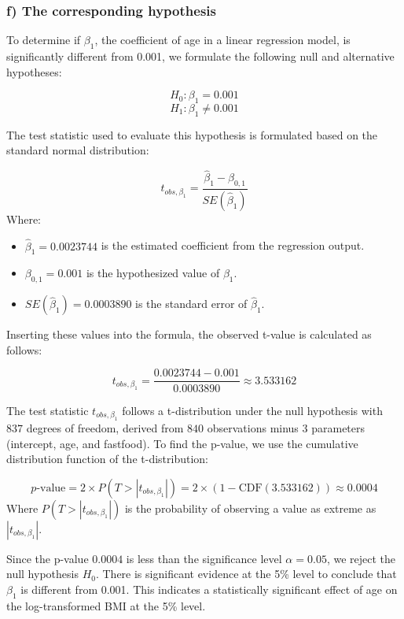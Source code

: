 \documentclass{rapport}
\begin{document}
\pagebreak

\subsubsection*{\textbf{f)} The corresponding hypothesis}
\noindent
To determine if \( \beta_1 \), the coefficient of age in a linear regression model, is significantly different from 0.001, we formulate the following null and alternative hypotheses:

\[
H_0: \beta_1 = 0.001
\]
\[
H_1: \beta_1 \neq 0.001
\]

\noindent
The test statistic used to evaluate this hypothesis is formulated based on the standard normal distribution:

\[
t_{obs, \beta_1} = \frac{\hat{\beta}_1 - \beta_{0,1}}{SE(\hat{\beta}_1)}
\]
\noindent
Where:
\begin{itemize}
    \item \( \hat{\beta}_1 = 0.0023744 \) is the estimated coefficient from the regression output.
    \item \( \beta_{0,1} = 0.001 \) is the hypothesized value of \( \beta_1 \).
    \item \( SE(\hat{\beta}_1) = 0.0003890 \) is the standard error of \( \hat{\beta}_1 \).
\end{itemize}
\noindent
Inserting these values into the formula, the observed t-value is calculated as follows:

\[
t_{obs, \beta_1} = \frac{0.0023744 - 0.001}{0.0003890} \approx 3.533162
\]


\noindent
The test statistic \( t_{obs, \beta_1} \) follows a t-distribution under the null hypothesis with \( 837 \) degrees of freedom, derived from \( 840 \) observations minus \( 3 \) parameters (intercept, age, and fastfood).
\noindent
To find the p-value, we use the cumulative distribution function of the t-distribution:

\[
p\text{-value} = 2 \times P(T > |t_{obs, \beta_1}|) = 2 \times (1 - \text{CDF}(3.533162)) \approx 0.0004
\]
\noindent
Where \( P(T > |t_{obs, \beta_1}|) \) is the probability of observing a value as extreme as \( |t_{obs, \beta_1}| \).


\noindent
Since the p-value \( 0.0004 \) is less than the significance level \( \alpha = 0.05 \), we reject the null hypothesis \( H_0 \). There is significant evidence at the 5\% level to conclude that \( \beta_1 \) is different from 0.001. This indicates a statistically significant effect of age on the log-transformed BMI at the 5\% level.
\end{document}
